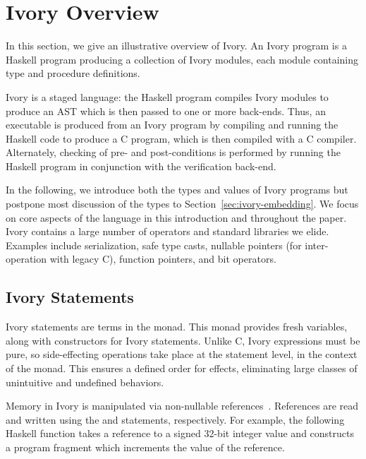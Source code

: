 \section{Ivory Overview}
\label{sec:ivory-overview}


In this section, we give an illustrative overview of Ivory.  An Ivory
program is a Haskell program producing a collection of Ivory modules,
each module containing type and procedure definitions.  %

Ivory is a staged language: the Haskell program compiles Ivory modules
to produce an AST which is then passed to one or more back-ends.  Thus,
an executable is produced from an Ivory program by compiling and
running the Haskell code to produce a C program, which is then
compiled with a C compiler.  Alternately, checking of pre- and
post-conditions is performed by running the Haskell program in
conjunction with the verification back-end.

In the following, we introduce both the types and values of Ivory programs but
postpone most discussion of the types to Section~\ref{sec:ivory-embedding}. We
focus on core aspects of the language in this introduction and throughout
the paper. Ivory contains a large number of operators and standard libraries we
elide. Examples include serialization, safe type casts, nullable pointers (for
inter-operation with legacy C), function pointers, and bit operators.

\subsection{Ivory Statements}

Ivory statements are terms in the  monad.  This monad
provides fresh variables, along with constructors for Ivory
statements. Unlike C, Ivory expressions must be pure, so
side-effecting operations take place at the statement level, in
the context of the monad. This ensures a defined order for effects,
eliminating large classes of unintuitive and undefined behaviors.

Memory in Ivory is manipulated via non-nullable references~\cite{memareas}.
References are read and written using the  and 
statements, respectively.  For example, the following Haskell function
takes a reference to a signed 32-bit integer value and constructs
a program fragment which increments the value of the reference.

